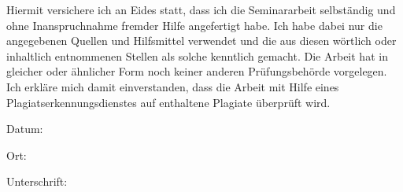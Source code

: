 \begin{titlepage}
\thispagestyle{empty}
Hiermit versichere ich an Eides statt, dass ich die Seminararbeit selbst{\"a}ndig und ohne Inanspruchnahme fremder Hilfe angefertigt habe. Ich habe dabei nur die angegebenen Quellen und Hilfsmittel verwendet und die aus diesen w{\"o}rtlich oder inhaltlich entnommenen Stellen als solche kenntlich gemacht. Die Arbeit hat in gleicher oder {\"a}hnlicher Form noch keiner anderen Pr{\"u}fungsbeh{\"o}rde vorgelegen. Ich erkl{\"a}re mich damit einverstanden, dass die Arbeit mit Hilfe eines Plagiatserkennungsdienstes auf enthaltene Plagiate {\"u}berpr{\"u}ft wird.

  \vspace*{2.5cm}

Datum: \hfill 
  \vspace*{1.5cm}

Ort: \hfill 
  \vspace*{1.5cm}

Unterschrift: \hfill

\end{titlepage}